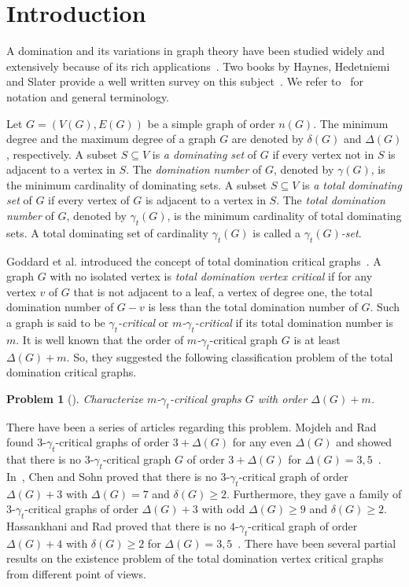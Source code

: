 \documentclass[12pt]{amsart}
\newtheorem{open}[thm]{Problem}
\begin{document}
\section{Introduction} \label{intr}

A domination and its variations in graph theory have been studied widely and extensively
because of its rich applications~\cite{GHHM, HM, HMM, MR}.
Two books by Haynes, Hedetniemi and Slater provide a well written survey on this subject~\cite{HHS, HHS2}.
We refer to~\cite{HHS} for notation and general terminology.

Let $G=(V(G),E(G))$ be a simple graph of order $n(G)$.
The minimum degree and the maximum degree of a graph $G$ are denoted by $\delta(G)$ and
$\Delta(G)$, respectively.
A subset $S\subseteq V$ is \emph{a dominating  set} of $G$ if every
vertex not in $S$ is adjacent to a vertex in $S$. The
\emph{domination number} of $G$, denoted by $\gamma(G)$, is the minimum
cardinality of dominating sets. A subset $S\subseteq V$ is \emph{a total dominating set} of $G$ if every vertex of $G$ is adjacent to
a vertex in $S$. The \emph{total domination number} of $G$, denoted
by $\gamma_{t}(G)$, is the minimum cardinality of total
dominating sets. A total dominating set of cardinality
$\gamma_{t}(G)$ is called a \emph{$\gamma_{t}(G)$-set}.

Goddard et al. introduced the concept of total domination critical
graphs~\cite{GHHM}. A graph $G$ with no isolated vertex is
\emph{total domination vertex critical} if for any vertex $v$ of
$G$ that is not adjacent to a leaf, a vertex of degree one, the
total domination number of $G-v$ is less than the total domination
number of $G$. Such a graph is said to be
\emph{$\gamma_{t}$-critical} or \emph{$m$-$\gamma_{t}$-critical}
if its total domination number is $m$.
It is well known that the order of \emph{$m$-$\gamma_{t}$}-critical graph $G$  is at least $\Delta(G)+m$. So, they suggested the following classification
problem of the total domination critical graphs.

\begin{open} [\cite{GHHM}]\label{open1}
Characterize $m$-$\gamma_{t}$-critical graphs $G$ with order
$\Delta(G)+m$.
\end{open}

There have been a series of articles regarding this problem. Mojdeh and Rad found $3$-$\gamma_{t}$-critical graphs of
order $3 + \Delta(G)$ for any even $\Delta(G)$ and showed that
there is no $3$-$\gamma_{t}$-critical graph $G$ of order $3 + \Delta(G)$ for
$\Delta(G)= 3, 5$~\cite{MR}. In~\cite{CS}, Chen and Sohn
proved that there is no $3$-$\gamma_{t}$-critical graph of order
$\Delta(G)+3$ with $\Delta(G)=7$ and $\delta(G)\geq 2$.
Furthermore, they gave a family of $3$-$\gamma_{t}$-critical
graphs of order $\Delta(G)+3$ with odd $\Delta(G)\geq 9$ and
$\delta(G)\geq 2$. Hassankhani and Rad proved that there is no $4$-$\gamma_{t}$-critical graph of
order $\Delta(G)+4$ with $\delta(G)\geq 2$ for $\Delta(G)= 3,
5$~\cite{HaR}. There have been several partial results on the
existence problem of the total domination vertex critical graphs
from different point of views.
\end{document}
